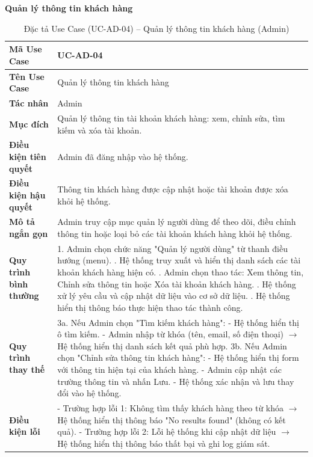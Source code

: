 \textbf{Quản lý thông tin khách hàng}
\renewcommand{\arraystretch}{1.3}
\setlength{\tabcolsep}{4pt}
\begin{longtable}{|p{}|p{}|}
\caption{Đặc tả Use Case (UC-AD-04) -- Quản lý thông tin khách hàng (Admin)}\label{tab:uc_manage_customers}\\
\hline
\textbf{Mã Use Case} & UC-AD-04 \\ \hline
\textbf{Tên Use Case} & Quản lý thông tin khách hàng \\ \hline
\textbf{Tác nhân} & Admin \\ \hline
\textbf{Mục đích} & Quản lý thông tin tài khoản khách hàng: xem, chỉnh sửa, tìm kiếm và xóa tài khoản. \\ \hline
\textbf{Điều kiện tiên quyết} & Admin đã đăng nhập vào hệ thống. \\ \hline
\textbf{Điều kiện hậu quyết} & Thông tin khách hàng được cập nhật hoặc tài khoản được xóa khỏi hệ thống. \\ \hline
\textbf{Mô tả ngắn gọn} & Admin truy cập mục quản lý người dùng để theo dõi, điều chỉnh thông tin hoặc loại bỏ các tài khoản khách hàng khỏi hệ thống. \\ \hline
\textbf{Quy trình bình thường} &
1. Admin chọn chức năng "Quản lý người dùng" từ thanh điều hướng (menu). \newline
2. Hệ thống truy xuất và hiển thị danh sách các tài khoản khách hàng hiện có. \newline
3. Admin chọn thao tác: Xem thông tin, Chỉnh sửa thông tin hoặc Xóa tài khoản khách hàng. \newline
4. Hệ thống xử lý yêu cầu và cập nhật dữ liệu vào cơ sở dữ liệu. \newline
5. Hệ thống hiển thị thông báo thực hiện thao tác thành công. \\ \hline
\textbf{Quy trình thay thế} &
3a. Nếu Admin chọn "Tìm kiếm khách hàng": \newline
- Hệ thống hiển thị ô tìm kiếm. \newline
- Admin nhập từ khóa (tên, email, số điện thoại) $\rightarrow$ Hệ thống hiển thị danh sách kết quả phù hợp. \newline
3b. Nếu Admin chọn "Chỉnh sửa thông tin khách hàng": \newline
- Hệ thống hiển thị form với thông tin hiện tại của khách hàng. \newline
- Admin cập nhật các trường thông tin và nhấn Lưu. \newline
- Hệ thống xác nhận và lưu thay đổi vào hệ thống. \\ \hline
\textbf{Điều kiện lỗi} &
- Trường hợp lỗi 1: Không tìm thấy khách hàng theo từ khóa $\rightarrow$ Hệ thống hiển thị thông báo "No results found" (không có kết quả). \newline
- Trường hợp lỗi 2: Lỗi hệ thống khi cập nhật dữ liệu $\rightarrow$ Hệ thống hiển thị thông báo thất bại và ghi log giám sát. \\ \hline
\end{longtable}


